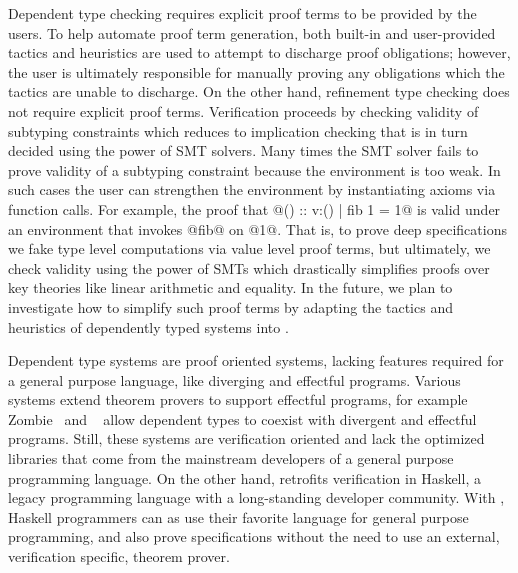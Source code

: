 Dependent type checking requires explicit proof terms to be provided by the users. 
%
To help automate proof term generation, both built-in and user-provided
tactics and heuristics are used to attempt to discharge proof obligations; however,
the user is ultimately responsible for manually proving any
obligations which the tactics are unable to discharge.
%
On the other hand, refinement type checking 
does not require explicit proof terms. 
%
Verification proceeds by checking validity of subtyping constraints 
which reduces to implication checking that is in turn
decided using the power of SMT solvers. 
%
Many times the SMT solver fails to prove 
validity of a subtyping constraint because the environment is too weak. 
%
In such cases the user can strengthen the environment by instantiating 
axioms via function calls. 
%
For example, the proof that @() :: {v:() | fib 1 = 1}@ 
is valid under an environment that invokes @fib@ on @1@.
%
That is, to prove deep specifications we fake type level computations
via value level proof terms, but ultimately, 
we check validity using the power of SMTs
which drastically simplifies proofs over key theories
like linear arithmetic and equality.
%
In the future, we plan to investigate how to simplify such proof terms
by adapting the tactics and heuristics of dependently typed systems
into \toolname. 

Dependent type systems are proof oriented systems, lacking 
features required for a general purpose language, like 
diverging and effectful programs. 
%
Various systems extend theorem provers to support effectful programs, 
for example 
Zombie~\cite{Zombie,Sjoberg2015} and \fstar~\cite{fstar} allow dependent types to
coexist with divergent and effectful programs. 
%
Still, these systems are verification oriented and lack the 
optimized libraries that come from the mainstream developers of 
a general purpose programming language.  
%
On the other hand, \toolname 
retrofits verification in Haskell,
a legacy programming language with 
a long-standing developer community. 
%
With \toolname, 
Haskell programmers can as use their favorite  
language for general purpose programming, 
and also prove specifications without the need to use an external, 
verification specific, theorem prover. 




